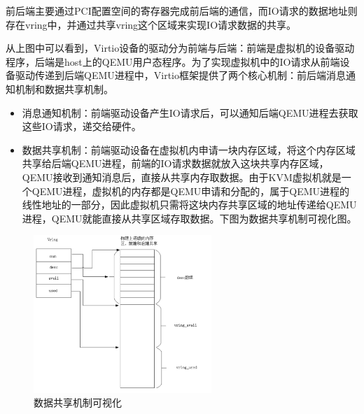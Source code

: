 前后端主要通过PCI配置空间的寄存器完成前后端的通信，而IO请求的数据地址则存在vring中，并通过共享vring这个区域来实现IO请求数据的共享。

从上图中可以看到，Virtio设备的驱动分为前端与后端：前端是虚拟机的设备驱动程序，后端是host上的QEMU用户态程序。为了实现虚拟机中的IO请求从前端设备驱动传递到后端QEMU进程中，Virtio框架提供了两个核心机制：前后端消息通知机制和数据共享机制。
\begin{itemize}
	\item 消息通知机制：前端驱动设备产生IO请求后，可以通知后端QEMU进程去获取这些IO请求，递交给硬件。
	\item 数据共享机制：前端驱动设备在虚拟机内申请一块内存区域，将这个内存区域共享给后端QEMU进程，前端的IO请求数据就放入这块共享内存区域，QEMU接收到通知消息后，直接从共享内存取数据。由于KVM虚拟机就是一个QEMU进程，虚拟机的内存都是QEMU申请和分配的，属于QEMU进程的线性地址的一部分，因此虚拟机只需将这块内存共享区域的地址传递给QEMU进程，QEMU就能直接从共享区域存取数据。下图为数据共享机制可视化图。
\end{itemize}
\begin{figure}[H]
    \centering
    \includegraphics[width=0.6\textwidth]{figures/06-03-3.png}
    \caption{数据共享机制可视化}
\end{figure}